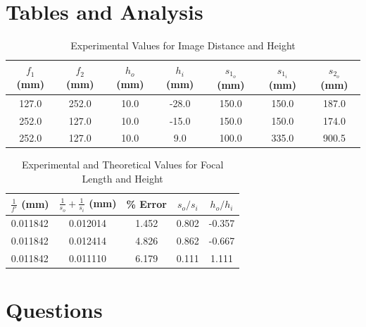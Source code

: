 \documentclass{amsart}
\begin{document}
\pagebreak

\section{Tables and Analysis}
\begin{table}[H]
\centering
\caption{Experimental Values for Image Distance and Height}
\label{my-label}
\begin{tabular}{c|c|c|c|c|c|c}
$f_1$ (mm) & $f_2$ (mm) & $h_o$ (mm) & $h_i$ (mm) & $s_{1_o}$ (mm) & $s_{1_i}$ (mm) & $s_{2_o}$ (mm) \\ \hline
127.0        & 252.0        & 10.0         & -28.0        & 150.0       & 150.0   & 187.0       \\
252.0        & 127.0        & 10.0         & -15.0        & 150.0       & 150.0   & 174.0       \\
252.0        & 127.0        & 10.0         & 9.0          & 100.0       & 335.0   & 900.5
\end{tabular}
\end{table}

\begin{table}[H]
\centering
\caption{Experimental and Theoretical Values for Focal Length and Height}
\label{my-label}
\begin{tabular}{c|c|c||c|c}
$\frac{1}{f\prime}$ (mm) & $\frac{1}{s_o} + \frac{1}{s_i}$ (mm) & \% Error & $s_o/s_i$ & ${h_o}/{h_i}$ \\ \hline
0.011842                 & 0.012014                             & 1.452    & 0.802             & -0.357            \\
0.011842                 & 0.012414                             & 4.826    & 0.862             & -0.667            \\
0.011842                 & 0.011110                             & 6.179    & 0.111             & 1.111
\end{tabular}
\end{table}

\section{Questions}
\end{document}
